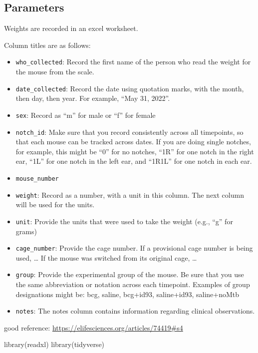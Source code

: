 \documentclass[
]{book}
\newenvironment{Shaded}{\begin{snugshade}}{\end{snugshade}}
\newcommand{\FunctionTok}[1]{\textcolor[rgb]{0.00,0.00,0.00}{#1}}
\newcommand{\NormalTok}[1]{#1}
\providecommand{\tightlist}{%
  \setlength{\itemsep}{0pt}\setlength{\parskip}{0pt}}
\begin{document}
\hypertarget{parameters}{%
\subsection{Parameters}\label{parameters}}

Weights are recorded in an excel worksheet.

Column titles are as follows:

\begin{itemize}
\tightlist
\item
  \texttt{who\_collected}: Record the first name of the person who read the weight for the mouse from the scale.
\item
  \texttt{date\_collected}: Record the date using quotation marks, with the month, then day, then year. For example, ``May 31, 2022''.
\item
  \texttt{sex}: Record as ``m'' for male or ``f'' for female
\item
  \texttt{notch\_id}: Make sure that you record consistently across all timepoints, so that each mouse can be tracked across dates. If you are doing single notches, for example, this might be ``0'' for no notches, ``1R'' for one notch in the right ear, ``1L'' for one notch in the left ear, and ``1R1L'' for one notch in each ear.
\item
  \texttt{mouse\_number}
\item
  \texttt{weight}: Record as a number, with a unit in this column. The next column will be used for the units.
\item
  \texttt{unit}: Provide the units that were used to take the weight (e.g., ``g'' for grams)
\item
  \texttt{cage\_number}: Provide the cage number. If a provisional cage number is being used, \ldots{} If the mouse was switched from its original cage, \ldots{}
\item
  \texttt{group}: Provide the experimental group of the mouse. Be sure that you use the same abbreviation or notation across each timepoint. Examples of group designations might be: bcg, saline, bcg+id93, saline+id93, saline+noMtb
\item
  \texttt{notes}: The notes column contains information regarding clinical observations.
\end{itemize}

good reference: \url{https://elifesciences.org/articles/74419\#s4}

\begin{Shaded}
\begin{Highlighting}[]
\FunctionTok{library}\NormalTok{(readxl)}
\FunctionTok{library}\NormalTok{(tidyverse)}
\end{Highlighting}
\end{Shaded}
\end{document}
